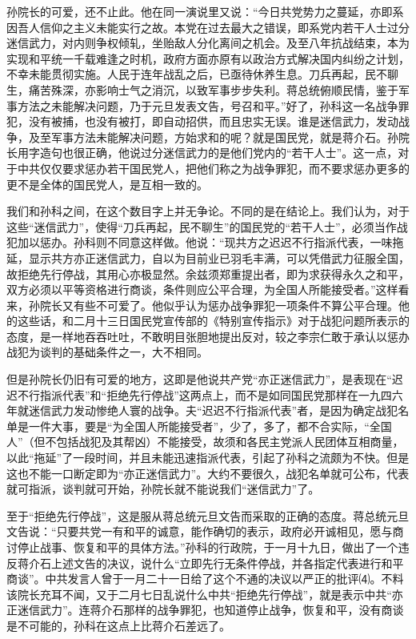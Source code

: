 \documentclass[UTF-8, a5paper, 12pt]{ctexart}
\begin{document}
孙院长的可爱，还不止此。他在同一演说里又说：“今日共党势力之蔓延，亦即系因吾人信仰之主义未能实行之故。本党在过去最大之错误，即系党内若干人士过分迷信武力，对内则争权倾轧，坐贻敌人分化离间之机会。及至八年抗战结束，本为实现和平统一千载难逢之时机，政府方面亦原有以政治方式解决国内纠纷之计划，不幸未能贯彻实施。人民于连年战乱之后，已亟待休养生息。刀兵再起，民不聊生，痛苦殊深，亦影响士气之消沉，以致军事步步失利。蒋总统俯顺民情，鉴于军事方法之未能解决问题，乃于元旦发表文告，号召和平。”好了，孙科这一名战争罪犯，没有被捕，也没有被打，即自动招供，而且忠实无误。谁是迷信武力，发动战争，及至军事方法未能解决问题，方始求和的呢？就是国民党，就是蒋介石。孙院长用字造句也很正确，他说过分迷信武力的是他们党内的“若干人士”。这一点，对于中共仅仅要求惩办若干国民党人，把他们称之为战争罪犯，而不要求惩办更多的更不是全体的国民党人，是互相一致的。

我们和孙科之间，在这个数目字上并无争论。不同的是在结论上。我们认为，对于这些“迷信武力”，使得“刀兵再起，民不聊生”的国民党的“若干人士”，必须当作战犯加以惩办。孙科则不同意这样做。他说：“现共方之迟迟不行指派代表，一味拖延，显示共方亦正迷信武力，自以为目前业已羽毛丰满，可以凭借武力征服全国，故拒绝先行停战，其用心亦极显然。余兹须郑重提出者，即为求获得永久之和平，双方必须以平等资格进行商谈，条件则应公平合理，为全国人所能接受者。”这样看来，孙院长又有些不可爱了。他似乎认为惩办战争罪犯一项条件不算公平合理。他的这些话，和二月十三日国民党宣传部的《特别宣传指示》对于战犯问题所表示的态度，是一样地吞吞吐吐，不敢明目张胆地提出反对，较之李宗仁敢于承认以惩办战犯为谈判的基础条件之一，大不相同。

但是孙院长仍旧有可爱的地方，这即是他说共产党“亦正迷信武力”，是表现在“迟迟不行指派代表”和“拒绝先行停战”这两点上，而不是如同国民党那样在一九四六年就迷信武力发动惨绝人寰的战争。夫“迟迟不行指派代表”者，是因为确定战犯名单是一件大事，要是“为全国人所能接受者”，少了，多了，都不合实际，“全国人”（但不包括战犯及其帮凶）不能接受，故须和各民主党派人民团体互相商量，以此“拖延”了一段时间，并且未能迅速指派代表，引起了孙科之流颇为不快。但是这也不能一口断定即为“亦正迷信武力”。大约不要很久，战犯名单就可公布，代表就可指派，谈判就可开始，孙院长就不能说我们“迷信武力”了。

至于“拒绝先行停战”，这是服从蒋总统元旦文告而采取的正确的态度。蒋总统元旦文告说：“只要共党一有和平的诚意，能作确切的表示，政府必开诚相见，愿与商讨停止战事、恢复和平的具体方法。”孙科的行政院，于一月十九日，做出了一个违反蒋介石上述文告的决议，说什么“立即先行无条件停战，并各指定代表进行和平商谈”。中共发言人曾于一月二十一日给了这个不通的决议以严正的批评⑷。不料该院长充耳不闻，又于二月七日乱说什么中共“拒绝先行停战”，就是表示中共“亦正迷信武力”。连蒋介石那样的战争罪犯，也知道停止战争，恢复和平，没有商谈是不可能的，孙科在这点上比蒋介石差远了。
\end{document}
